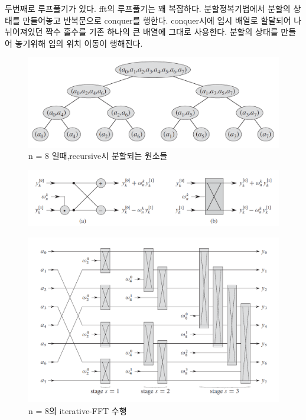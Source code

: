 두번째로 루프풀기가 있다.
fft의 루프풀기는 꽤 복잡하다.
분할정복기법에서 분할의 상태를 만들어놓고 반복문으로 conquer를 행한다.
conquer시에 임시 배열로 할달되어 나뉘어져있던 짝수 홀수를 기존 하나의 큰 배열에 그대로 사용한다.
분할의 상태를 만들어 놓기위해 임의 위치 이동이 행해진다.


\begin{figure}[h!]
    \centering
    \includegraphics[scale=0.4]{./FFT/pic/pic3.PNG}
    \caption{n = 8 일때,recursive시 분할되는 원소들}
\end{figure}

\begin{figure}[h!]
    \centering
    \includegraphics[scale=0.5]{./FFT/pic/pic4.PNG}
\end{figure}


\begin{figure}[h!]
    \centering
    \includegraphics[scale=0.5]{./FFT/pic/pic5.PNG}
    \caption{n = 8의 iterative-FFT 수행}
\end{figure}



